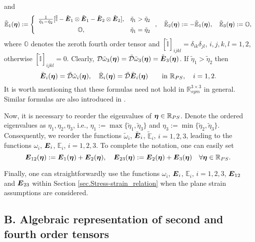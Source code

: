 \documentclass[a4paper,12pt]{article}
\theoremstyle{remark}
\newcommand{\mbf}[1]{\mbox{\boldmath$#1$}}
\numberwithin{equation}{section}
\begin{document}
and
$$\tilde{\mathbb E}_1(\mbf\eta):=\left\{
\begin{array}{c l}
\frac{1}{\tilde\eta_1-\tilde\eta_2}[\tilde{\mathbb I}-\tilde{\mbf E}_1\otimes\tilde{\mbf E}_1-\tilde{\mbf E}_2\otimes\tilde{\mbf E}_2], & \tilde\eta_1>\tilde\eta_2\\[2mm]
\mathbb O, & \tilde\eta_1=\tilde\eta_2
\end{array}
\right.,\quad \tilde{\mathbb E}_2(\mbf\eta):=-\tilde{\mathbb E}_1(\mbf\eta),\quad \tilde{\mathbb E}_3(\mbf\eta):=\mathbb O,$$
where $\mathbb O$ denotes the zeroth fourth order tensor and $[\tilde{\mathbb I}]_{ijkl}=\delta_{ik}\delta_{jl}$, $i,j,k,l=1,2$, otherwise $[\tilde{\mathbb I}]_{ijkl}=0$. Clearly, $\mathcal D\tilde\omega_3(\mbf\eta)=\tilde{\mathcal D}\tilde\omega_3(\mbf\eta)=\tilde{\mbf E}_3(\mbf\eta)$. If $\tilde\eta_1>\tilde\eta_2$ then
$$\tilde{\mbf E}_i(\mbf\eta)=\tilde{\mathcal D}\tilde\omega_i(\mbf\eta),\quad \tilde{\mathbb E}_i(\mbf\eta)=\tilde{\mathcal D}\tilde{\mbf E}_i(\mbf\eta)\qquad\mbox{in } \mathbb R_{PS},\quad i=1,2.$$
It is worth mentioning that these formulas need not hold in $\mathbb R^{3\times 3}_{sym}$ in general. Similar formulas are also introduced in \cite[Appendix A]{NPO08}.

Now, it is necessary to reorder the eigenvalues of $\mbf\eta\in\mathbb R_{PS}$. Denote the ordered eigenvalues as $\eta_1,\eta_2,\eta_3$, i.e., $\eta_1:=\max\{\tilde\eta_1,\tilde\eta_3\}$ and $\eta_3:=\min\{\tilde\eta_2,\tilde\eta_3\}$. Consequently, we reorder the functions $\tilde\omega_i$, $\tilde{\mbf E}_i$, $\tilde{\mathbb E}_i$, $i=1,2,3$, leading to the functions $\omega_i$, $\mbf E_i$, $\mathbb E_i$, $i=1,2,3$. To complete the notation, one can easily set 
$$\mbf E_{12}(\mbf\eta):=\mbf E_1(\mbf\eta)+\mbf E_2(\mbf\eta),\quad \mbf E_{23}(\mbf\eta):=\mbf E_2(\mbf\eta)+\mbf E_3(\mbf\eta)\quad \forall\mbf\eta\in \mathbb R_{PS}.$$

Finally, one can straightforwardly use the functions $\omega_i$, $\mbf E_i$, $\mathbb E_i$, $i=1,2,3$, $\mbf E_{12}$ and $\mbf E_{23}$ within Section \ref{sec.Stress-strain_relation} when the plane strain assumptions are considered.


\subsection*{B. Algebraic representation of second and fourth order tensors}
\end{document}
